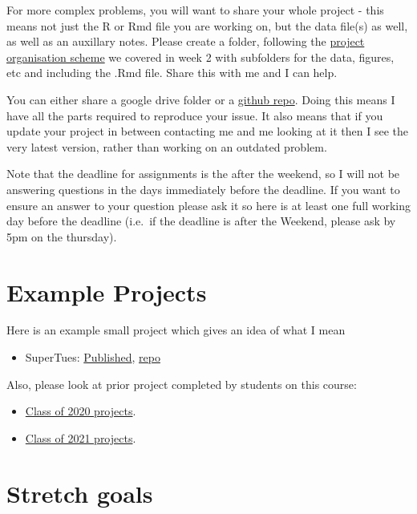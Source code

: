 \documentclass[
]{book}
\providecommand{\tightlist}{%
  \setlength{\itemsep}{0pt}\setlength{\parskip}{0pt}}
\begin{document}
For more complex problems, you will want to share your whole project - this means not just the R or Rmd file you are working on, but the data file(s) as well, as well as an auxillary notes.
Please create a folder, following the \href{project-organisation.html}{project organisation scheme} we covered in week 2 with subfolders for the data, figures, etc and including the .Rmd file. Share this with me and I can help.

You can either share a google drive folder or a \href{git-and-github.html}{github repo}. Doing this means I have all the parts required to reproduce your issue. It also means that if you update your project in between contacting me and me looking at it then I see the very latest version, rather than working on an outdated problem.

Note that the deadline for assignments is the after the weekend, so I will not be answering questions in the days immediately before the deadline. If you want to ensure an answer to your question please ask it so here is at least one full working day before the deadline (i.e.~if the deadline is after the Weekend, please ask by 5pm on the thursday).

\hypertarget{example-projects}{%
\section{Example Projects}\label{example-projects}}

Here is an example small project which gives an idea of what I mean

\begin{itemize}
\tightlist
\item
  SuperTues: \href{https://tomstafford.github.io/supertues/}{Published}, \href{https://github.com/tomstafford/supertues}{repo}
\end{itemize}

Also, please look at prior project completed by students on this course:

\begin{itemize}
\tightlist
\item
  \href{class-of-2020.html}{Class of 2020 projects}.
\item
  \href{class-of-2021.html}{Class of 2021 projects}.
\end{itemize}

\hypertarget{stretch-goals}{%
\section{Stretch goals}\label{stretch-goals}}
\end{document}
